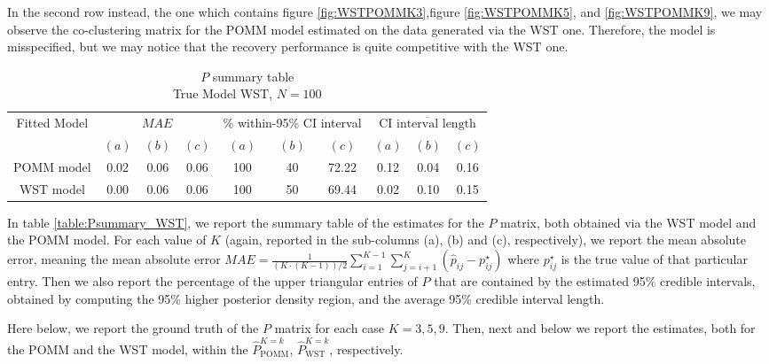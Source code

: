 \documentclass[11pt]{amsart}
\begin{document}
In the second row instead, the one which contains figure \ref{fig:WSTPOMMK3},figure \ref{fig:WSTPOMMK5}, and \ref{fig:WSTPOMMK9}, we may observe the co-clustering matrix for the POMM model estimated on the data generated via the WST one. Therefore, the model is misspecified, but we may notice that the recovery performance is quite competitive with the WST one.



\begin{table}[htbp]
\centering
\caption{
{\large $P$ summary table} \\ 
{\small True Model WST, $N=100$}
} 
\begin{tabular}{cccccccccc}
\toprule
\multirow{2}{*}{Fitted Model} & \multicolumn{3}{c}{
$MAE$ } & \multicolumn{3}{c}{
$\%$ within-95\% CI interval} & \multicolumn{3}{c}{ $\overline{\text{CI interval length}}$} \\
\cmidrule(lr){2-4} \cmidrule(lr){5-7} \cmidrule(lr){8-10}
& $(a)$ & $(b)$ & $(c)$ & $(a)$ & $(b)$ & $(c)$ & $(a)$ & $(b)$ & $(c)$ \\
\midrule
POMM model  &0.02 & 0.06 & 0.06 & 100 & 40 & 72.22 & 0.12 & 0.04 & 0.16 \\
WST model & 0.00 & 0.06 & 0.06 & 100 & 50 & 69.44 & 0.02 & 0.10 & 0.15 \\
\bottomrule
\end{tabular}
\label{table:Psummary_WST}
\end{table}

In table \eqref{table:Psummary_WST}, we report the summary table of the estimates for the $P$ matrix, both obtained via the WST model and the POMM model. For each value of $K$ (again, reported in the sub-columns (a), (b) and (c), respectively), we report the mean absolute error, meaning the mean absolute error $MAE = \frac{1}{(K\cdot(K-1))/2} \sum_{i=1}^{K-1}\sum_{j=i+1}^K \left(\hat{p}_{ij} - p^\star_{ij}\right)$ where $p^\star_{ij}$ is the true value of that particular entry. Then we also report the percentage of the upper triangular entries of $P$ that are contained by the estimated 95\% credible intervals, obtained by computing the 95\% higher posterior density region, and the average 95\% credible interval length. 

Here below, we report the ground truth of the $P$ matrix for each case $K=3,5,9$. Then, next and below we report the estimates, both for the POMM and the WST model, within the $\hat{P}^{K=k}_{\text{POMM}}$, $\hat{P}^{K=k}_{\text{WST}}$, respectively.
\end{document}

